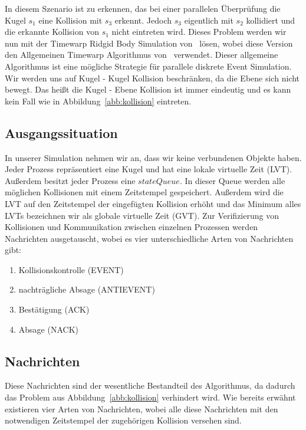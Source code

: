 \documentclass[a4paper, 10pt, openright, parskip, chapterprefix]{scrreprt}
\begin{document}
In diesem Szenario ist zu erkennen, das bei einer parallelen Überprüfung die Kugel $s_1$ eine Kollision mit $s_3$ erkennt. Jedoch $s_3$ eigentlich mit $s_2$ kollidiert und die erkannte Kollision von $s_1$ nicht eintreten wird.  Dieses Problem werden wir nun mit der Timewarp Ridgid Body Simulation von~\cite{timewarp} lösen, wobei diese Version den Allgemeinen Timewarp Algorithmus von~\cite{jefferson} verwendet. Dieser allgemeine Algorithmus ist eine mögliche Strategie für parallele diskrete Event Simulation.\\
Wir werden uns auf Kugel - Kugel Kollision beschränken, da die Ebene sich nicht bewegt. Das heißt die Kugel - Ebene Kollision ist immer eindeutig und es kann kein Fall wie in Abbildung~\ref{abb:kollision} eintreten. 

\subsection{Ausgangssituation}
In unserer Simulation nehmen wir an, dass wir keine verbundenen Objekte haben. Jeder Prozess repräsentiert eine Kugel und hat eine lokale virtuelle Zeit (LVT). Außerdem besitzt jeder Prozess eine $stateQueue$. In dieser Queue werden alle möglichen Kollisionen mit einem Zeitstempel gespeichert.  Außerdem wird die LVT auf den Zeitstempel der eingefügten Kollision erhöht und das Minimum alles LVTs bezeichnen wir als globale virtuelle Zeit (GVT). Zur Verifizierung  von Kollisionen und Kommunikation zwischen einzelnen Prozessen werden Nachrichten ausgetauscht, wobei es vier unterschiedliche Arten von Nachrichten gibt:

\begin{enumerate}
\item Kollisionskontrolle (EVENT)
\item nachträgliche Absage (ANTIEVENT)
\item Bestätigung (ACK)
\item Absage (NACK)
\end{enumerate}

\subsection{Nachrichten}

Diese  Nachrichten sind der wesentliche Bestandteil des Algorithmus, da dadurch das Problem aus Abbildung~\ref{abb:kollision} verhindert wird. Wie bereits erwähnt existieren vier Arten von Nachrichten, wobei alle diese Nachrichten mit den notwendigen Zeitstempel der zugehörigen Kollision versehen sind.
\end{document}
